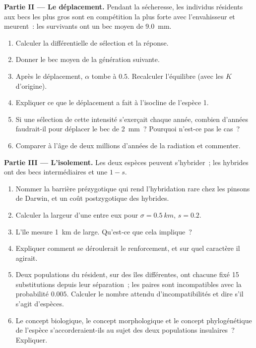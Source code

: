 \begin{problem}
\medskip
\noindent\textbf{Partie II --- Le déplacement.}
Pendant la sécheresse, les individus résidents aux becs les plus gros
sont en compétition la plus forte avec l'envahisseur et meurent~: les
survivants ont un bec moyen de \qty{9.0}{mm}.
\begin{enumerate}[resume]
  \item Calculer la différentielle de sélection et la réponse.
  \item Donner le bec moyen de la génération suivante.
  \item Après le déplacement, $\alpha$ tombe à $0.5$. Recalculer
        l'équilibre (avec les $K$ d'origine).
  \item Expliquer ce que le déplacement a fait à l'isocline de l'espèce 1.
  \item Si une sélection de cette intensité s'exerçait chaque année,
        combien d'années faudrait-il pour déplacer le bec de \qty{2}{mm}~?
        Pourquoi n'est-ce pas le cas~?
  \item Comparer à l'âge de deux millions d'années de la radiation et
        commenter.
\end{enumerate}

\medskip
\noindent\textbf{Partie III --- L'isolement.}
Les deux espèces peuvent s'hybrider~; les hybrides ont des becs
intermédiaires et une  $1 - s$.
\begin{enumerate}[resume]
  \item Nommer la barrière prézygotique qui rend l'hybridation rare chez
        les pinsons de Darwin, et un coût postzygotique des
        hybrides.
  \item Calculer la largeur d'une  entre eux pour $\sigma
        = \qty{0.5}{km}$, $s = 0.2$.
  \item L'île mesure \qty{1}{km} de large. Qu'est-ce que cela implique~?
  \item Expliquer comment se déroulerait le renforcement, et sur quel
        caractère il agirait.
  \item Deux populations du résident, sur des îles différentes, ont
        chacune fixé 15 substitutions depuis leur séparation~; les paires
        sont incompatibles avec la probabilité $0.005$. Calculer le nombre
        attendu d'incompatibilités et dire s'il s'agit d'espèces.
  \item Le concept biologique, le concept morphologique et le concept
        phylogénétique de l'espèce s'accorderaient-ils au sujet des deux
        populations insulaires~? Expliquer.
\end{enumerate}


\end{problem}
